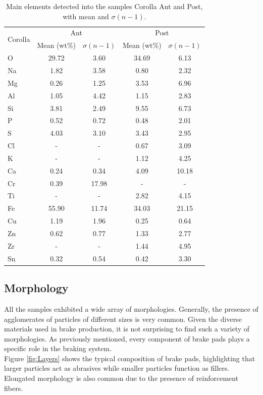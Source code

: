 \begin{table}[H]\centering
  \begin{tabular}{lcccc}
    \toprule
    \multirow{2}{*}[-0.5\dimexpr \aboverulesep + \belowrulesep + \cmidrulewidth]{Corolla}
    & \multicolumn{2}{c}{Ant} & \multicolumn{2}{c}{Post} \\
    \cmidrule(l){2-3} \cmidrule(l){4-5}
    & Mean (wt\%) & $\sigma (n-1)$ & Mean (wt\%) & $\sigma (n-1)$ \\
    \midrule
    O & 29.72 & 3.60 & 34.69 & 6.13 \\
    Na & 1.82 & 3.58 & 0.80 & 2.32 \\
    Mg & 0.26 & 1.25 & 3.53 & 6.96 \\
    Al & 1.05 & 4.42 & 1.15 & 2.83 \\
    Si & 3.81 & 2.49 & 9.55 & 6.73 \\
    P & 0.52 & 0.72 & 0.48 & 2.01 \\
    S & 4.03 & 3.10 & 3.43 & 2.95 \\
    Cl & - & - & 0.67 & 3.09 \\
    K & - & - & 1.12 & 4.25 \\
    Ca & 0.24 & 0.34 & 4.09 & 10.18 \\
    Cr & 0.39 & 17.98 & - & - \\
    Ti & - & - & 2.82 & 4.15 \\
    Fe & 55.90 & 11.74 & 34.03 & 21.15 \\
    Cu & 1.19 & 1.96 & 0.25 & 0.64 \\
    Zn & 0.62 & 0.77 & 1.33 & 2.77 \\
    Zr & - & - & 1.44 & 4.95 \\
    Sn & 0.32 & 0.54 & 0.42 & 3.30 \\
    \bottomrule
  \end{tabular}
    \caption{Main elements detected into the samples Corolla Ant and Post, with mean and $\sigma (n-1)$.}
    \label{fig:Elements_Corolla}
\end{table}
\pagebreak

\subsection{Morphology}

All the samples exhibited a wide array of morphologies. Generally, the presence of agglomerates of particles of different sizes is very common. Given the diverse materials used in brake production, it is not surprising to find such a variety of morphologies. As previously mentioned, every component of brake pads plays a specific role in the braking system. \\
Figure \ref{fig:Layers} shows the typical composition of brake pads, highlighting that larger particles act as abrasives while smaller particles function as fillers. Elongated morphology is also common due to the presence of reinforcement fibers.

